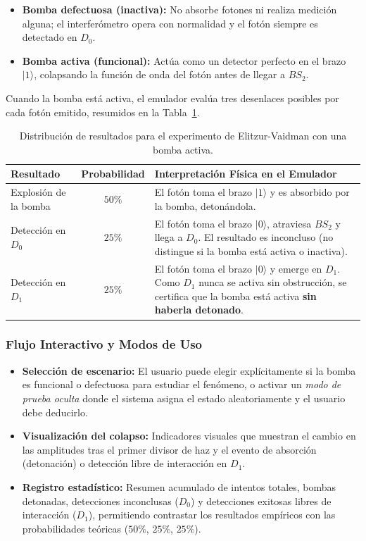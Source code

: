 \documentclass{article}
\begin{document}
\begin{itemize}
    \item \textbf{Bomba defectuosa (inactiva):} No absorbe fotones ni realiza medición alguna; el interferómetro opera con normalidad y el fotón siempre es detectado en $D_0$.
    \item \textbf{Bomba activa (funcional):} Actúa como un detector perfecto en el brazo $|1\rangle$, colapsando la función de onda del fotón antes de llegar a $BS_2$.
\end{itemize}

Cuando la bomba está activa, el emulador evalúa tres desenlaces posibles por cada fotón emitido, resumidos en la Tabla~\ref{tab:elitzur_vaidman}.

\begin{table}[h!]
    \centering
    \begin{tabular}{|l|c|p{7.5cm}|}
        \hline
        \textbf{Resultado} & \textbf{Probabilidad} & \textbf{Interpretación Física en el Emulador} \\
        \hline
        Explosión de la bomba & $50\%$ & El fotón toma el brazo $|1\rangle$ y es absorbido por la bomba, detonándola. \\
        \hline
        Detección en $D_0$ & $25\%$ & El fotón toma el brazo $|0\rangle$, atraviesa $BS_2$ y llega a $D_0$. El resultado es inconcluso (no distingue si la bomba está activa o inactiva). \\
        \hline
        Detección en $D_1$ & $25\%$ & El fotón toma el brazo $|0\rangle$ y emerge en $D_1$. Como $D_1$ nunca se activa sin obstrucción, se certifica que la bomba está activa \textbf{sin haberla detonado}. \\
        \hline
    \end{tabular}
    \caption{Distribución de resultados para el experimento de Elitzur-Vaidman con una bomba activa.}
    \label{tab:elitzur_vaidman}
\end{table}

\subsubsection{Flujo Interactivo y Modos de Uso}
\begin{itemize}
    \item \textbf{Selección de escenario:} El usuario puede elegir explícitamente si la bomba es funcional o defectuosa para estudiar el fenómeno, o activar un \textit{modo de prueba oculta} donde el sistema asigna el estado aleatoriamente y el usuario debe deducirlo.
    \item \textbf{Visualización del colapso:} Indicadores visuales que muestran el cambio en las amplitudes tras el primer divisor de haz y el evento de absorción (detonación) o detección libre de interacción en $D_1$.
    \item \textbf{Registro estadístico:} Resumen acumulado de intentos totales, bombas detonadas, detecciones inconclusas ($D_0$) y detecciones exitosas libres de interacción ($D_1$), permitiendo contrastar los resultados empíricos con las probabilidades teóricas ($50\%$, $25\%$, $25\%$).
\end{itemize}
\end{document}
